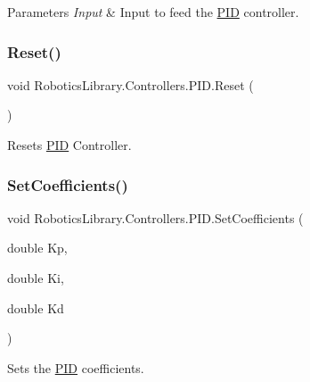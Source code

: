 \begin{DoxyParams}{Parameters}
{\em Input} & Input to feed the \hyperlink{class_robotics_library_1_1_controllers_1_1_p_i_d}{P\+ID} controller.\\
\hline
\end{DoxyParams}
\mbox{\label{class_robotics_library_1_1_controllers_1_1_p_i_d_aeb32b13f82f1bce070b8b3447eb598ac}} 
\subsubsection{\texorpdfstring{Reset()}{Reset()}}
{\footnotesize\ttfamily void Robotics\+Library.\+Controllers.\+P\+I\+D.\+Reset (\begin{DoxyParamCaption}{ }\end{DoxyParamCaption})}



Resets \hyperlink{class_robotics_library_1_1_controllers_1_1_p_i_d}{P\+ID} Controller. 

\mbox{\label{class_robotics_library_1_1_controllers_1_1_p_i_d_ab9aaa784943a2afcb07cf7b87cb8d5c3}} 
\subsubsection{\texorpdfstring{Set\+Coefficients()}{SetCoefficients()}}
{\footnotesize\ttfamily void Robotics\+Library.\+Controllers.\+P\+I\+D.\+Set\+Coefficients (\begin{DoxyParamCaption}\item[{double}]{Kp,  }\item[{double}]{Ki,  }\item[{double}]{Kd }\end{DoxyParamCaption})}



Sets the \hyperlink{class_robotics_library_1_1_controllers_1_1_p_i_d}{P\+ID} coefficients. 


